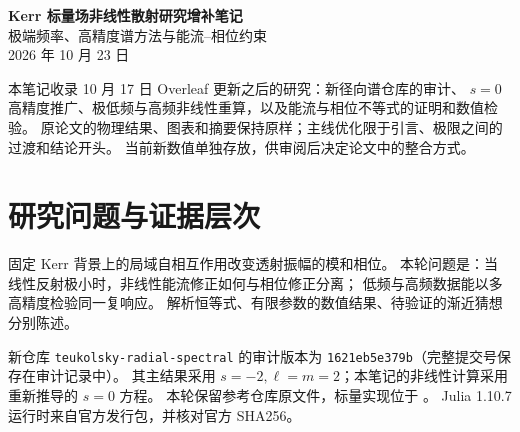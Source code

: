 \documentclass[UTF8,fontset=fandol,11pt,a4paper]{ctexart}
\numberwithin{equation}{section}
\begin{document}
\begin{center}
{\LARGE\bfseries Kerr 标量场非线性散射研究增补笔记}\\[5mm]
{\large 极端频率、高精度谱方法与能流--相位约束}\\[3mm]
2026 年 10 月 23 日
\end{center}
\begin{resultbox}
本笔记收录 10 月 17 日 Overleaf 更新之后的研究：新径向谱仓库的审计、
$s=0$ 高精度推广、极低频与高频非线性重算，以及能流与相位不等式的证明和数值检验。
原论文的物理结果、图表和摘要保持原样；主线优化限于引言、极限之间的过渡和结论开头。
当前新数值单独存放，供审阅后决定论文中的整合方式。
\end{resultbox}
\setcounter{tocdepth}{1}
\tableofcontents\clearpage

\section{研究问题与证据层次}
固定 Kerr 背景上的局域自相互作用改变透射振幅的模和相位。
本轮问题是：当线性反射极小时，非线性能流修正如何与相位修正分离；
低频与高频数据能以多高精度检验同一复响应。
解析恒等式、有限参数的数值结果、待验证的渐近猜想分别陈述。

新仓库 \texttt{teukolsky-radial-spectral} 的审计版本为
\texttt{1621eb5e379b}（完整提交号保存在审计记录中）。
其主结果采用 $s=-2,\ell=m=2$；本笔记的非线性计算采用重新推导的 $s=0$ 方程。
本轮保留参考仓库原文件，标量实现位于 。
Julia 1.10.7 运行时来自官方发行包，并核对官方 SHA256。
\end{document}

